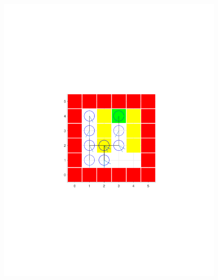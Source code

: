 \documentclass{article}
\begin{document}
\begin{figure}[h!]
\begin{minipage}{0.4\textwidth}
{			\includegraphics[trim={5cm 9cm 3cm 9cm},clip,scale = 0.55]{plots/Probabilistic/5b23.pdf}
			\label{fig:subfig2}} 
		

\end{minipage}
\end{figure}
\end{document}
